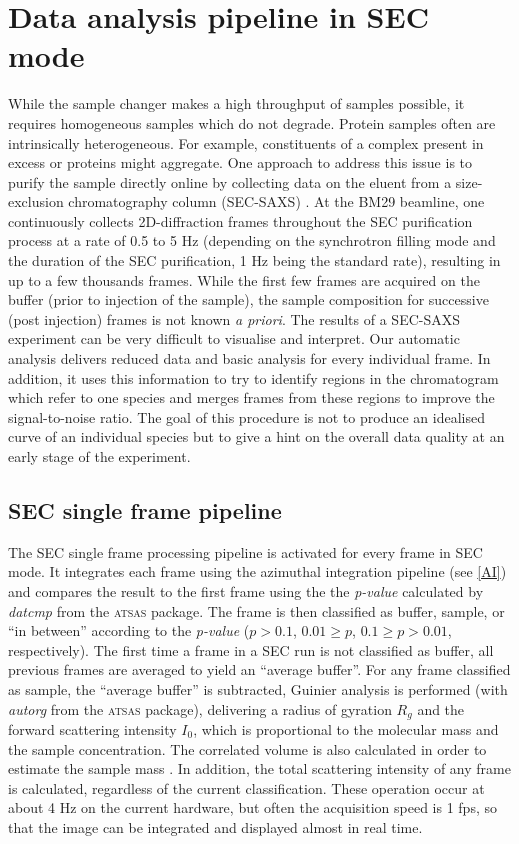 \documentclass[preprint,pdf]{iucr}              %
\begin{document}
\section{Data analysis pipeline in SEC mode}
While the sample changer makes a high throughput of samples possible, it
requires homogeneous samples which do not degrade.
Protein samples often are intrinsically heterogeneous.
For example, constituents of a complex present in excess or proteins
might aggregate.
One approach to address this issue is to purify the sample directly online by collecting data
on the eluent from a size-exclusion chromatography column (SEC-SAXS) \cite{SECPaper2012,SECP12,SECSWING}.
At the BM29 beamline, one continuously collects 2D-diffraction frames
throughout the SEC purification process at a rate of 0.5 to 5 Hz
(depending on the synchrotron filling mode and the duration of the SEC
purification, 1 Hz being the standard rate), resulting in up to a few thousands
frames.
While the first few frames are acquired on the buffer (prior to injection of the sample), the sample composition
for successive (post injection) frames is not known \textit{a priori}.
The results of a SEC-SAXS experiment can be very difficult to visualise and interpret.
Our automatic analysis delivers reduced data and basic analysis for
every individual frame.
In addition, it uses this information to try to identify regions in the
chromatogram which refer to one species and merges frames from these
regions to improve the signal-to-noise ratio.
The goal of this procedure is not to produce an idealised curve of an individual
species but to give a hint on the overall data quality at an early stage of
the experiment.

\subsection{SEC single frame pipeline}

The SEC single frame processing pipeline is activated for every frame in SEC
mode.
It integrates each frame using the azimuthal integration pipeline (see
\ref{AI}) and compares the result to the first frame using the the
\textit{p-value} calculated by \textit{datcmp} from the \textsc{atsas} package.
The frame is then classified as buffer, sample, or ``in between''
according to the \textit{p-value} ($p>0.1$, $0.01 \geq p$, $0.1 \geq p >0.01$, 
respectively).
The first time a frame in a SEC run is not classified as buffer, all previous
frames are averaged to yield an ``average buffer''.
For any frame classified as sample, the ``average buffer'' is subtracted, Guinier
analysis is performed (with \textit{autorg} from the \textsc{atsas} package),
delivering a radius of gyration $R_g$ and the forward scattering intensity
$I_0$, which is proportional to the molecular mass and the sample concentration. 
The correlated volume is also calculated in order to estimate the
sample mass \cite{RamboTainerNature2013}.
In addition, the total scattering intensity of any
frame is calculated, regardless of the current classification.
These operation occur at about 4 Hz on the current hardware, but often the
acquisition speed is 1 fps, so that the image can be integrated and displayed
almost in real time.
\end{document}
